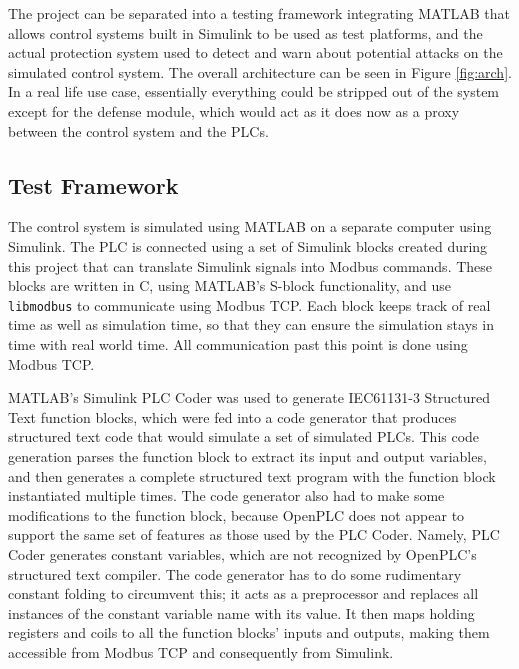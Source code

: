 \documentclass[10pt,twocolumn]{IEEEtran}
\begin{document}
The project can be separated into a testing framework integrating MATLAB that allows control systems built in Simulink to be used as test platforms, and the actual protection system used to detect and warn about potential attacks on the simulated control system.
The overall architecture can be seen in Figure \ref{fig:arch}.
In a real life use case, essentially everything could be stripped out of the system except for the defense module, which would act as it does now as a proxy between the control system and the PLCs.

\subsection{Test Framework} \label{sec:test}
The control system is simulated using MATLAB on a separate computer using Simulink.
The PLC is connected using a set of Simulink blocks created during this project that can translate Simulink signals into Modbus commands.
These blocks are written in C, using MATLAB's S-block functionality, and use \texttt{libmodbus} to communicate using Modbus TCP.
Each block keeps track of real time as well as simulation time, so that they can ensure the simulation stays in time with real world time.
All communication past this point is done using Modbus TCP.

MATLAB's Simulink PLC Coder was used to generate IEC61131-3 Structured Text function blocks, which were fed into a code generator that produces structured text code that would simulate a set of simulated PLCs.
This code generation parses the function block to extract its input and output variables, and then generates a complete structured text program with the function block instantiated multiple times.
The code generator also had to make some modifications to the function block, because OpenPLC does not appear to support the same set of features as those used by the PLC Coder.
Namely, PLC Coder generates constant variables, which are not recognized by OpenPLC's structured text compiler.
The code generator has to do some rudimentary constant folding to circumvent this; it acts as a preprocessor and replaces all instances of the constant variable name with its value.
It then maps holding registers and coils to all the function blocks' inputs and outputs, making them accessible from Modbus TCP and consequently from Simulink.
\end{document}
